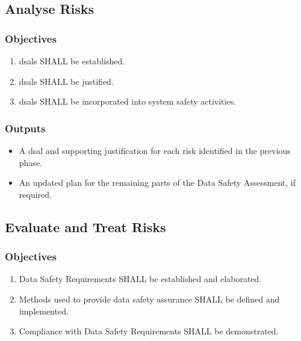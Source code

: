 \subsection{Analyse Risks}
\subsubsection{Objectives}
\begin{enumerate}[label=\color{dsiwgAccentColour}{3-\arabic*}]
	\item \Glspl{dsal} SHALL be established.
	\item \Glspl{dsal} SHALL be justified.
	\item \Glspl{dsal} SHALL be incorporated into system safety activities.
\end{enumerate}

\subsubsection{Outputs}
\begin{itemize}
	\item A \gls{dsal} and supporting justification for each risk identified in the previous phase.
	\item An updated plan for the remaining parts of the Data Safety Assessment, if required.
\end{itemize}

\subsection{Evaluate and Treat Risks}
\subsubsection{Objectives}
\begin{enumerate}[label=\color{dsiwgAccentColour}{4-\arabic*}]
	\item {}Data Safety Requirements SHALL be established and elaborated.
	\item Methods used to provide data safety assurance SHALL be defined and implemented.
	\item Compliance with Data Safety Requirements SHALL be demonstrated.	
\end{enumerate}

